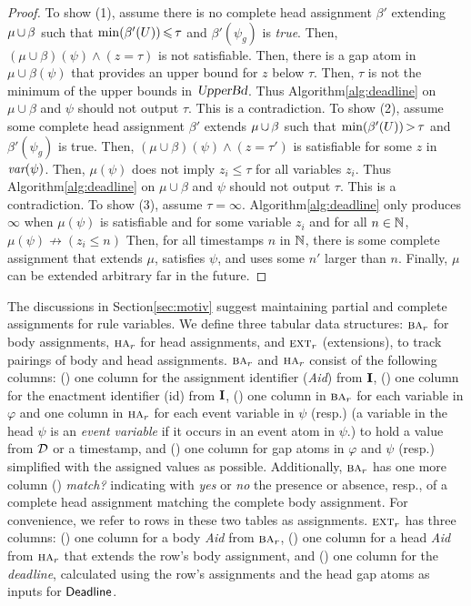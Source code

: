 \begin{proof}
  To show (1),
  assume there is no complete head assignment $\beta'$
  extending $\mu\,{\cup}\,\beta$
  such that $\min(\beta'(U))\,{\leqslant}\,\tau$
  and $\beta'(\psi_g)$ is {\sl true}.
  Then,
  $(\mu\cup\beta)(\psi)\land (z=\tau)$
  is not satisfiable.
  Then,
  there is a gap atom in $\mu\cup\beta(\psi)$
  that provides an upper bound for $z$
  below $\tau$.
  Then,
  $\tau$ is not the minimum of the upper bounds
  in $\textsl{UpperBd}$.
  Thus Algorithm\:\ref{alg:deadline}
  on $\mu\cup\beta$ and $\psi$ should not output $\tau$.
  This is a contradiction.
  To show (2), assume some complete head assignment $\beta'$
  extends $\mu\,{\cup}\,\beta$
  such that $\min(\beta'(U))\,{>}\,\tau$
  and $\beta'(\psi_g)$ is true.
  Then, 
  $(\mu\cup\beta)(\psi)\land (z=\tau')$
  is satisfiable for some $z$ in $\textit{var}(\psi)$.
  Then, $\mu(\psi)$ does not imply $z_i\leq \tau$
  for all variables $z_i$.
  Thus Algorithm\:\ref{alg:deadline}
  on $\mu\cup\beta$ and $\psi$ should not output $\tau$.
  This is a contradiction.
  To show (3),
  assume $\tau=\infty$.
  Algorithm\:\ref{alg:deadline} only produces 
  $\infty$ when
  $\mu(\psi)$ is satisfiable and 
  for some variable $z_i$ and for all $n\in\mathbb{N}$,
  $\mu(\psi)\not\rightarrow (z_i \leq n)$
  Then,
  for all timestamps $n$ in $\mathbb{N}$,
  there is some complete assignment that extends $\mu$,
  satisfies $\psi$,
  and uses some $n'$ larger than $n$.
  Finally,
  $\mu$ can be extended arbitrary far in the future.
\end{proof}

The discussions in Section\:\ref{sec:motiv}
suggest
maintaining partial and complete assignments for rule variables.
We define three tabular data structures:
$\BODY/_r$ for body assignments,
$\HEAD/_r$ for head assignments, and
$\textsc{ext}_r$ (extensions),
to track pairings of body and head assignments.
$\BODY/_r$ and $\HEAD/_r$ consist of the following columns:
() one column for the assignment identifier ({\it Aid}) from $\textbf{I}$,
() one column for the enactment identifier ({\sc id}) from $\textbf{I}$,
() one column in $\BODY/_r$ for each variable in $\varphi$ and
one column in $\HEAD/_r$ for each event variable in $\psi$ (resp.)
(a variable in the head $\psi$ is an {\em event variable}
if it occurs in an event atom in $\psi$.)
to hold a value from $\mathcal{D}$ or a timestamp, and
() one column for gap atoms in $\varphi$ and $\psi$ (resp.)
simplified with the assigned values as possible.
Additionally,
$\BODY/_r$ has one more column
() {\em match?} indicating with {\em yes} or {\em no}
the presence or absence, resp.,
of a complete head assignment matching the complete body assignment.
For convenience, we refer to rows in these two tables as assignments.
$\textsc{ext}_r$ has three columns:
() one column for a body {\it Aid} from $\BODY/_r$,
() one column for a head {\it Aid} from $\HEAD/_r$
that extends the row's body assignment, 
and 
() one column for the {\em deadline},
calculated using the row's assignments and the head gap atoms
as inputs for ${\sf Deadline}$.

